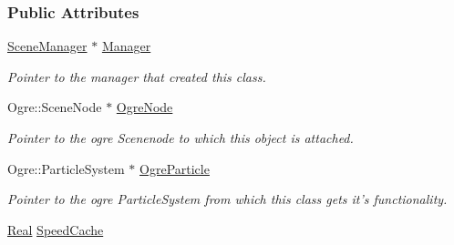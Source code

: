 \subsubsection*{Public Attributes}
\begin{DoxyCompactItemize}
\item 
\hypertarget{structMezzanine_1_1internal_1_1ParticleEffectInternalData_ab27dcc612ec9da3cc4e8fdccc5b94be9}{
\hyperlink{classMezzanine_1_1SceneManager}{SceneManager} $\ast$ \hyperlink{structMezzanine_1_1internal_1_1ParticleEffectInternalData_ab27dcc612ec9da3cc4e8fdccc5b94be9}{Manager}}
\label{structMezzanine_1_1internal_1_1ParticleEffectInternalData_ab27dcc612ec9da3cc4e8fdccc5b94be9}

\begin{DoxyCompactList}\small\item\em Pointer to the manager that created this class. \item\end{DoxyCompactList}\item 
\hypertarget{structMezzanine_1_1internal_1_1ParticleEffectInternalData_ae3b7204ec581843fccb53fd66d0bea2c}{
Ogre::SceneNode $\ast$ \hyperlink{structMezzanine_1_1internal_1_1ParticleEffectInternalData_ae3b7204ec581843fccb53fd66d0bea2c}{OgreNode}}
\label{structMezzanine_1_1internal_1_1ParticleEffectInternalData_ae3b7204ec581843fccb53fd66d0bea2c}

\begin{DoxyCompactList}\small\item\em Pointer to the ogre Scenenode to which this object is attached. \item\end{DoxyCompactList}\item 
\hypertarget{structMezzanine_1_1internal_1_1ParticleEffectInternalData_abb9b3976faf30a1137c0470cd1b43918}{
Ogre::ParticleSystem $\ast$ \hyperlink{structMezzanine_1_1internal_1_1ParticleEffectInternalData_abb9b3976faf30a1137c0470cd1b43918}{OgreParticle}}
\label{structMezzanine_1_1internal_1_1ParticleEffectInternalData_abb9b3976faf30a1137c0470cd1b43918}

\begin{DoxyCompactList}\small\item\em Pointer to the ogre ParticleSystem from which this class gets it's functionality. \item\end{DoxyCompactList}\item 
\hypertarget{structMezzanine_1_1internal_1_1ParticleEffectInternalData_a95be58c99a287d0d728a433c9e11e354}{
\hyperlink{namespaceMezzanine_a726731b1a7df72bf3583e4a97282c6f6}{Real} \hyperlink{structMezzanine_1_1internal_1_1ParticleEffectInternalData_a95be58c99a287d0d728a433c9e11e354}{SpeedCache}}
\label{structMezzanine_1_1internal_1_1ParticleEffectInternalData_a95be58c99a287d0d728a433c9e11e354}


\end{DoxyCompactItemize}
